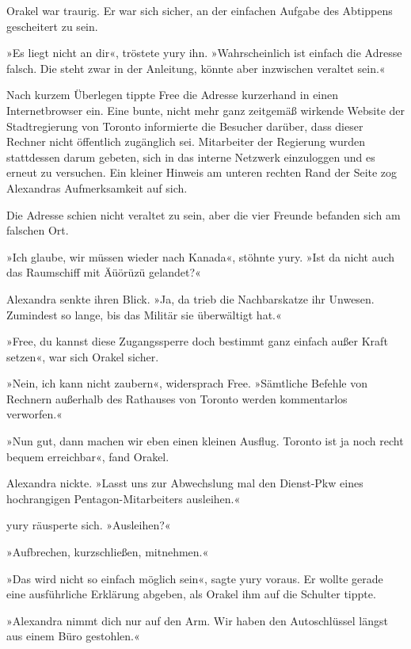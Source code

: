 Orakel war traurig. Er war sich sicher, an der einfachen Aufgabe des Abtippens gescheitert zu sein.

»Es liegt nicht an dir«, tröstete yury ihn. »Wahrscheinlich ist einfach die Adresse falsch. Die steht zwar in der Anleitung, könnte aber inzwischen veraltet sein.«

Nach kurzem Überlegen tippte Free die Adresse kurzerhand in einen Internetbrowser ein. Eine bunte, nicht mehr ganz zeitgemäß wirkende Website der Stadtregierung von Toronto informierte die Besucher darüber, dass dieser Rechner nicht öffentlich zugänglich sei. Mitarbeiter der Regierung wurden stattdessen darum gebeten, sich in das interne Netzwerk einzuloggen und es erneut zu versuchen. Ein kleiner Hinweis am unteren rechten Rand der Seite zog Alexandras Aufmerksamkeit auf sich.


Die Adresse schien nicht veraltet zu sein, aber die vier Freunde befanden sich am falschen Ort.

»Ich glaube, wir müssen wieder nach Kanada«, stöhnte yury. »Ist da nicht auch das Raumschiff mit Äüörüzü gelandet?«

Alexandra senkte ihren Blick. »Ja, da trieb die Nachbarskatze ihr Unwesen. Zumindest so lange, bis das Militär sie überwältigt hat.«

»Free, du kannst diese Zugangssperre doch bestimmt ganz einfach außer Kraft setzen«, war sich Orakel sicher.

»Nein, ich kann nicht zaubern«, widersprach Free. »Sämtliche Befehle von Rechnern außerhalb des Rathauses von Toronto werden kommentarlos verworfen.«

»Nun gut, dann machen wir eben einen kleinen Ausflug. Toronto ist ja noch recht bequem erreichbar«, fand Orakel.

Alexandra nickte. »Lasst uns zur Abwechslung mal den Dienst-Pkw eines hochrangigen Pentagon-Mitarbeiters ausleihen.«

yury räusperte sich. »Ausleihen?«

»Aufbrechen, kurzschließen, mitnehmen.«

»Das wird nicht so einfach möglich sein«, sagte yury voraus. Er wollte gerade eine ausführliche Erklärung abgeben, als Orakel ihm auf die Schulter tippte.

»Alexandra nimmt dich nur auf den Arm. Wir haben den Autoschlüssel längst aus einem Büro gestohlen.«

